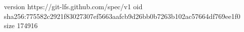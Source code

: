 version https://git-lfs.github.com/spec/v1
oid sha256:775582c2921f83027307ef5663aafcb9d26bb0b7263b102ac57664df769ee1f0
size 174916

